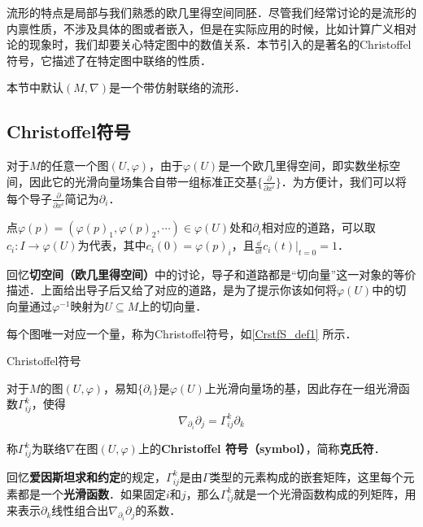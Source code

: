 

流形的特点是局部与我们熟悉的欧几里得空间同胚．尽管我们经常讨论的是流形的内禀性质，不涉及具体的图或者嵌入，但是在实际应用的时候，比如计算广义相对论的现象时，我们却要关心特定图中的数值关系．本节引入的是著名的Christoffel符号，它描述了在特定图中联络的性质．

本节中默认$(M, \nabla)$是一个带仿射联络的流形．


\subsection{Christoffel符号}

对于$M$的任意一个图$(U, \varphi)$，由于$\varphi(U)$是一个欧几里得空间，即实数坐标空间，因此它的光滑向量场集合自带一组标准正交基$\{\frac{\partial}{\partial x^i}\}$．为方便计，我们可以将每个导子$\frac{\partial}{\partial x^i}$简记为$\partial_i$．

点$\varphi(p)=(\varphi(p)_1, \varphi(p)_2, \cdots)\in\varphi(U)$处和$\partial_i$相对应的道路，可以取$c_i:I\to \varphi(U)$为代表，其中$c_i(0)=\varphi(p)_i$，且$\frac{\dd}{\dd t}c_i(t)|_{t=0}=1$．

回忆\textbf{切空间（欧几里得空间）}中的讨论，导子和道路都是“切向量”这一对象的等价描述．上面给出导子后又给了对应的道路，是为了提示你该如何将$\varphi(U)$中的切向量通过$\varphi^{-1}$映射为$U\subseteq M$上的切向量．

每个图唯一对应一个量，称为Christoffel符号，如\autoref{CrstfS_def1} 所示．

\begin{definition}{Christoffel符号}\label{CrstfS_def1}

对于$M$的图$(U, \varphi)$，易知$\{\partial_i\}$是$\varphi(U)$上光滑向量场的基，因此存在一组光滑函数$\Gamma^k_{ij}$，使得
\begin{equation}
\nabla_{\partial_i}\partial_j=\Gamma^k_{ij}\partial_k
\end{equation}

称$\Gamma^k_{ij}$为联络$\nabla$在图$(U, \varphi)$上的\textbf{Christoffel 符号（symbol）}，简称\textbf{克氏符}．
\end{definition}

回忆\textbf{爱因斯坦求和约定}的规定，$\Gamma^k_{ij}$是由$\Gamma$类型的元素构成的嵌套矩阵，这里每个元素都是一个\textbf{光滑函数}．如果固定$i$和$j$，那么$\Gamma^k_{ij}$就是一个光滑函数构成的列矩阵，用来表示$\partial_k$线性组合出$\nabla_{\partial_i}\partial_j$的系数．
















